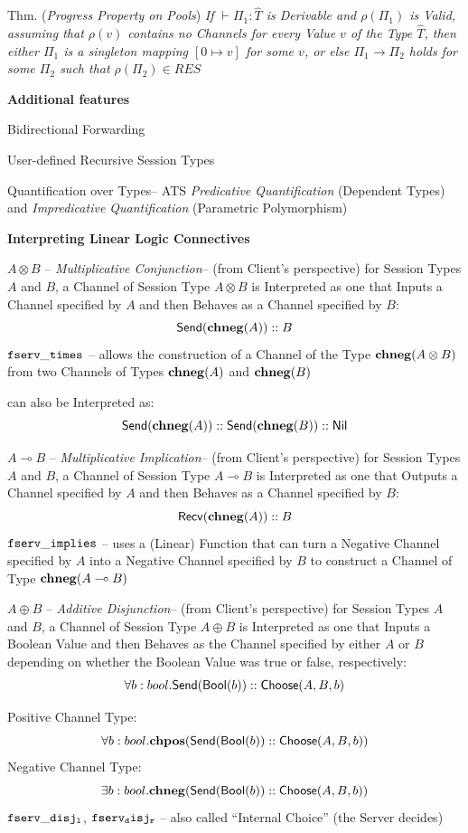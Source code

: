 Thm. (\emph{Progress Property on Pools}) \emph{If $\vdash \Pi_1 :
  \hat{T}$ is Derivable and $\rho(\Pi_1)$ is Valid, assuming that
  $\rho(v)$ contains no Channels for every Value $v$ of the Type
  $\hat{T}$, then either $\Pi_1$ is a singleton mapping $[0 \mapsto
    v]$ for some $v$, or else $\Pi_1 \rightarrow \Pi_2$ holds for some
  $\Pi_2$ such that $\rho(\Pi_2) \in RES$}


\textbf{Additional features}

Bidirectional Forwarding

User-defined Recursive Session Types

Quantification over Types-- ATS \emph{Predicative Quantification}
(Dependent Types) and \emph{Impredicative Quantification} (Parametric
Polymorphism)


\textbf{Interpreting Linear Logic Connectives}

$A \otimes B$ -- \emph{Multiplicative Conjunction}-- (from Client's
perspective) for Session Types $A$ and $B$, a Channel of Session Type
$A \otimes B$ is Interpreted as one that Inputs a Channel specified by
$A$ and then Behaves as a Channel specified by $B$:
\[
  \mathsf{Send}(\mathbf{chneg}(A)) :: B
\]
$\mathtt{fserv\_times}$ -- allows the construction of a Channel of the
Type $\mathbf{chneg}(A \otimes B)$ from two Channels of Types $\mathbf{chneg}(A)$ and
$\mathbf{chneg}(B)$

can also be Interpreted as:
\[
  \mathsf{Send}(\mathbf{chneg}(A)) :: \mathsf{Send}(\mathbf{chneg}(B)) :: \mathsf{Nil}
\]

$A \multimap B$ -- \emph{Multiplicative Implication}-- (from Client's
perspective) for Session Types $A$ and $B$, a Channel of Session Type
$A \multimap B$ is Interpreted as one that Outputs a Channel specified
by $A$ and then Behaves as a Channel specified by $B$:
\[
  \mathsf{Recv}(\mathbf{chneg}(A)) :: B
\]
$\mathtt{fserv\_implies}$ -- uses a (Linear) Function that can turn a
Negative Channel specified by $A$ into a Negative Channel specified by
$B$ to construct a Channel of Type $\mathbf{chneg}(A \multimap B)$

$A \oplus B$ -- \emph{Additive Disjunction}-- (from Client's
perspective) for Session Types $A$ and $B$, a Channel of Session Type
$A \oplus B$ is Interpreted as one that Inputs a Boolean Value and
then Behaves as the Channel specified by either $A$ or $B$ depending
on whether the Boolean Value was true or false, respectively:
\[
  \forall b : bool. \mathsf{Send}(\mathsf{Bool}(b)) :: \mathsf{Choose}(A,B,b)
\]

Positive Channel Type:
\[
  \forall b : bool. \mathbf{chpos}(\mathsf{Send}(\mathsf{Bool}(b)) :: \mathsf{Choose}(A,B,b))
\]
Negative Channel Type:
\[
  \exists b : bool. \mathbf{chneg}(\mathsf{Send}(\mathsf{Bool}(b)) :: \mathsf{Choose}(A,B,b))
\]
$\mathtt{fserv\_disj_l}$, $\mathtt{fserv_disj_r}$ -- also called ``Internal
Choice'' (the Server decides)

